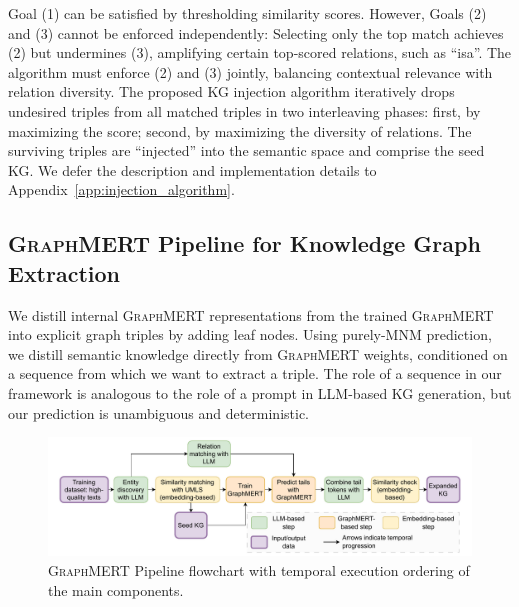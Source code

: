\documentclass[10pt]{article}
\newcommand{\ours}{\textsc{GraphMERT}\xspace}
\begin{document}
Goal (1) can be satisfied by thresholding similarity scores. However, Goals (2) and (3) cannot be enforced independently: Selecting only the top match achieves (2) but undermines (3), amplifying certain top-scored relations, such as ``isa''. The algorithm must enforce (2) and (3) jointly, balancing contextual relevance with relation diversity. The proposed KG injection algorithm iteratively drops undesired triples from all matched triples in two interleaving phases: first, by maximizing the score; second, by maximizing the diversity of relations. The surviving triples are ``injected'' into the semantic space and comprise the seed KG. We defer the description and implementation details to Appendix~\ref{app:injection_algorithm}.

\subsection{\ours Pipeline for Knowledge Graph Extraction}
\label{subsec:pipeline_for_extraction}

We distill internal \ours representations from the trained \ours into explicit graph triples by adding leaf nodes. Using purely-MNM prediction, we distill semantic knowledge directly from \ours weights, conditioned on a sequence from which we want to extract a triple. The role of a sequence in our framework is analogous to the role of a prompt in LLM-based KG generation, but our prediction is unambiguous and deterministic. 

\begin{figure}[t]
\centering
\includegraphics[width=\linewidth]{pictures/methodology_temporal.pdf}
\caption{\ours Pipeline flowchart with temporal execution ordering of the main components.}
\label{fig:temporal}
\end{figure}  
\end{document}
